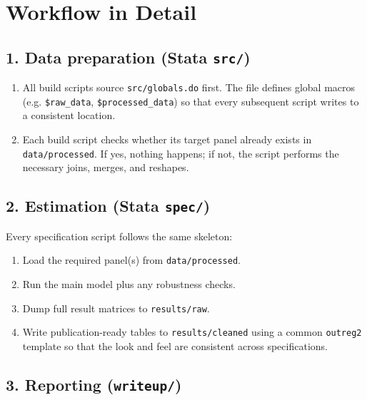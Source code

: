 \documentclass[11pt]{article}
\newcommand{\code}[1]{\texttt{#1}}
\begin{document}
\section{Workflow in Detail}

\subsection*{1. Data preparation (Stata \code{src/})}

\begin{enumerate}
  \item All build scripts source \code{src/globals.do} first.  The file defines
        global macros (e.g. \code{\$raw\_data}, \code{\$processed\_data}) so
        that every subsequent script writes to a consistent location.
  \item Each build script checks whether its target panel already exists in
        \code{data/processed}.  If yes, nothing happens; if not, the script
        performs the necessary joins, merges, and reshapes.
\end{enumerate}

\subsection*{2. Estimation (Stata \code{spec/})}

Every specification script follows the same skeleton:

\begin{enumerate}
  \item Load the required panel(s) from \code{data/processed}.
  \item Run the main model plus any robustness checks.
  \item Dump full result matrices to \code{results/raw}.
  \item Write publication-ready tables to \code{results/cleaned} using
        a common \code{outreg2} template so that the look and feel are
        consistent across specifications.
\end{enumerate}

\subsection*{3. Reporting (\code{writeup/})}
\end{document}
